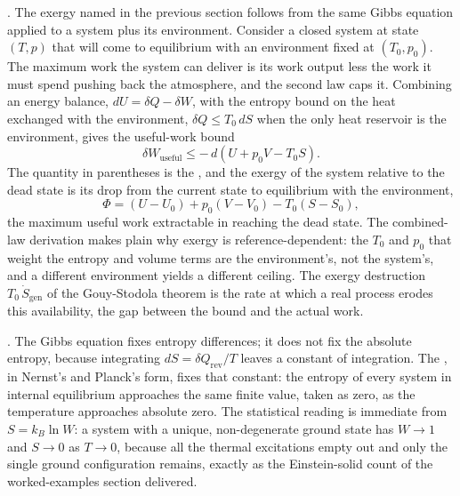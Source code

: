 . The exergy named in the
previous section follows from the same Gibbs equation applied to a system plus its
environment. Consider a closed system at state $(T,p)$ that will come to
equilibrium with an environment fixed at $(T_0,p_0)$. The maximum work the system
can deliver is its work output less the work it must spend pushing back the
atmosphere, and the second law caps it. Combining an energy balance, $dU = \delta
Q - \delta W$, with the entropy bound on the heat exchanged with the environment,
$\delta Q \le T_0\,dS$ when the only heat reservoir is the environment, gives the
useful-work bound
\[
\delta W_{\text{useful}} \le -\,d\!\left(U + p_0 V - T_0 S\right).
\]
The quantity in parentheses is the , and the
exergy of the system relative to the dead state is its drop from the current
state to equilibrium with the environment,
\[
\Phi = (U - U_0) + p_0(V - V_0) - T_0(S - S_0),
\]
the maximum useful work extractable in reaching the dead state. The combined-law
derivation makes plain why exergy is reference-dependent: the $T_0$ and $p_0$ that
weight the entropy and volume terms are the environment's, not the system's, and
a different environment yields a different ceiling. The exergy destruction
$T_0\,\dot S_{\text{gen}}$ of the Gouy-Stodola theorem is the rate at which a real
process erodes this availability, the gap between the bound and the actual work.

. The
Gibbs equation fixes entropy differences; it does not fix the absolute entropy,
because integrating $dS = \delta Q_{\text{rev}}/T$ leaves a constant of
integration. The , in Nernst's and Planck's
form, fixes that constant: the entropy of every system in internal equilibrium
approaches the same finite value, taken as zero, as the temperature approaches
absolute zero. The statistical reading is immediate from $S = k_B \ln W$: a system
with a unique, non-degenerate ground state has $W \to 1$ and $S \to 0$ as $T \to
0$, because all the thermal excitations empty out and only the single ground
configuration remains, exactly as the Einstein-solid count of the worked-examples
section delivered.

